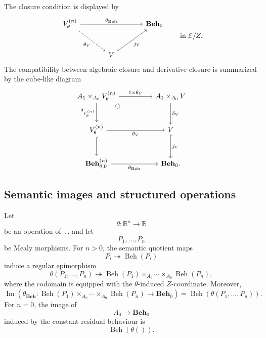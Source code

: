 The closure condition is displayed by
\[
\begin{tikzcd}[column sep=large, row sep=large]
    V^{(n)}_\theta
        \arrow[rr, "{\theta_{\mathbf{Beh}}}"]
        \arrow[dr, dashed, "\theta_V"']
    &&
    \mathbf{Beh}_0
    \\
    &
    V
        \arrow[ur, hook, "j_V"']
    &
\end{tikzcd}
\qquad
\text{in }\mathcal E/Z.
\]
The compatibility between algebraic closure and derivative closure is
summarized by the cube-like diagram
\[
\begin{tikzcd}[column sep=huge, row sep=large]
    A_1\times_{A_0}V^{(n)}_\theta
        \arrow[r, "{1\times \theta_V}"]
        \arrow[d, "\delta_{V^{(n)}_\theta}"']
        \arrow[dr, phantom, "\circlearrowleft", very near start]
    &
    A_1\times_{A_0}V
        \arrow[d, "\delta_V"]
    \\
    V^{(n)}_\theta
        \arrow[r, "\theta_V"']
        \arrow[d, hook]
    &
    V
        \arrow[d, hook, "j_V"]
    \\
    \mathbf{Beh}^{(n)}_{\theta,0}
        \arrow[r, "\theta_{\mathbf{Beh}}"']
    &
    \mathbf{Beh}_0 .
\end{tikzcd}
\]

\subsection{Semantic images and structured operations}
\label{subsec:semantic-images-structured-operations}

\begin{lemma}
\label{lem:semantic-images-structured-operations}
    Let
    \[
        \theta:\mathbb B^n\to\mathbb B
    \]
    be an operation of \(\mathbb T\), and let
    \[
        P_1,\dots,P_n
    \]
    be Mealy morphisms. For \(n>0\), the semantic quotient maps
    \[
        P_i\twoheadrightarrow\operatorname{Beh}(P_i)
    \]
    induce a regular epimorphism
    \[
        \theta(P_1,\dots,P_n)
        \twoheadrightarrow
        \operatorname{Beh}(P_1)\times_{A_0}\cdots\times_{A_0}
        \operatorname{Beh}(P_n),
    \]
    where the codomain is equipped with the \(\theta\)-induced
    \(Z\)-coordinate. Moreover,
    \[
        \operatorname{Im}
        \left(
        \theta_{\mathbf{Beh}}:
        \operatorname{Beh}(P_1)\times_{A_0}\cdots\times_{A_0}
        \operatorname{Beh}(P_n)
        \to
        \mathbf{Beh}_0
        \right)
        =
        \operatorname{Beh}(\theta(P_1,\dots,P_n)).
    \]
    For \(n=0\), the image of
    \[
        A_0\to\mathbf{Beh}_0
    \]
    induced by the constant residual behaviour is
    \[
        \operatorname{Beh}(\theta()).
    \]
\end{lemma}

